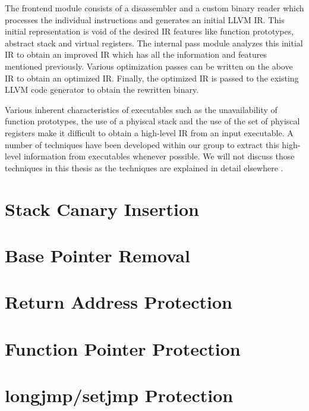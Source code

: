 The frontend module consists of a disassembler and a custom binary reader which processes the
individual instructions and generates an initial LLVM IR. This initial representation is void of the
desired IR features like function prototypes, abstract stack and virtual registers. The internal
pass module analyzes this initial IR to obtain an improved IR which has all the information and
features mentioned previously. Various optimization passes can be written on the above IR to obtain
an optimized IR. Finally, the optimized IR is passed to the existing LLVM code generator to obtain
the rewritten binary.

Various inherent characteristics of executables such as the unavailability of function prototypes,
the use of a phyiscal stack and the use of the set of phyiscal registers make it difficult to obtain
a high-level IR from an input executable. A number of techniques have been developed within our
group to extract this high-level information from executables whenever possible. We will not discuss
those techniques in this thesis as the techniques are explained in detail elsewhere \cite{}.

\section{Stack Canary Insertion}

\section{Base Pointer Removal}

\section{Return Address Protection}

\section{Function Pointer Protection}

\section{longjmp/setjmp Protection}
